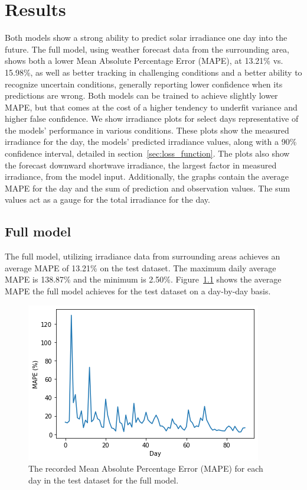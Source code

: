 \chapter{Results}
Both models show a strong ability to predict solar irradiance one day into the future.
The full model, using weather forecast data from the surrounding area, shows both a lower Mean Absolute Percentage Error (MAPE), at 13.21\% vs. 15.98\%, as well as better tracking in challenging conditions and a better ability to recognize uncertain conditions, generally reporting lower confidence when its predictions are wrong. Both models can be trained to achieve slightly lower MAPE, but that comes at the cost of a higher tendency to underfit variance and higher false confidence.
We show irradiance plots for select days representative of the models' performance in various conditions. These plots show the measured irradiance for the day, the models' predicted irradiance values, along with a 90\% confidence interval, detailed in section~\ref{sec:loss_function}. The plots also show the forecast downward shortwave irradiance, the largest factor in measured irradiance, from the model input. Additionally, the graphs contain the average MAPE for the day and the sum of prediction and observation values. The sum values act as a gauge for the total irradiance for the day.


\section{Full model}
The full model, utilizing irradiance data from surrounding areas achieves an average MAPE of 13.21\% on the test dataset. The maximum daily average MAPE is 138.87\% and the minimum is 2.50\%. Figure~\ref{fig:days_full} shows the average MAPE the full model achieves for the test dataset on a day-by-day basis.
\begin{figure}[ht!]
    \centering
    \includegraphics[scale=1]{imgs/graphs/full/days_full.png}
    \caption{The recorded Mean Absolute Percentage Error (MAPE) for each day in the test dataset for the full model. 
    \label{fig:days_full}}
\end{figure}




